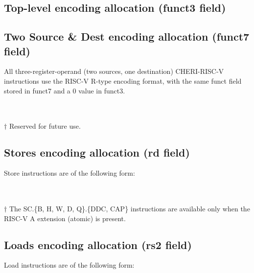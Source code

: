 {	\subsection*{Top-level encoding allocation (funct3 field)}
	{\scriptsize
	\rvcherienctabletop
	}

	\subsection*{Two Source \& Dest encoding allocation (funct7 field)}
	All three-register-operand (two sources, one destination) CHERI-RISC-V instructions use the RISC-V R-type encoding format, with the same funct field stored in funct7 and a 0 value in funct3.

	\vspace{1em}


	\vspace{1em}

	{\scriptsize
	\def\rvcherireservedfootnotemark{$\dagger$}
	\rvcherienctablesrcsrcdest\\\\
	$\dagger$ Reserved for future use.
	}

	\subsection*{Stores encoding allocation  (rd field)}
	Store instructions are of the following form:
	\vspace{1em}

	\rvcheriheader

	\vspace{1em}

	{\scriptsize
	\def\rvcheriatomicfootnotemark{$\dagger$}
	\rvcherienctableexpstore\\\\
	$\dagger$ The SC.\{B, H, W, D, Q\}.\{DDC, CAP\} instructions are available only when the RISC-V A extension (atomic) is present.
	}

	\vspace{1em}

	\subsection*{Loads encoding allocation  (rs2 field)}
	Load instructions are of the following form:
	\vspace{1em}

}
